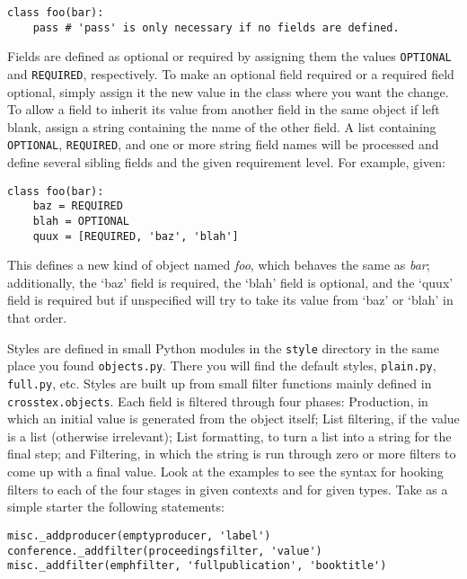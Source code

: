 \documentclass{article}
\begin{document}
\begin{small}\begin{verbatim}
class foo(bar):
    pass # 'pass' is only necessary if no fields are defined.
\end{verbatim}\end{small}

Fields are defined as optional or required by assigning them the values
\texttt{OPTIONAL} and \texttt{REQUIRED}, respectively.  To make an
optional field required or a required field optional, simply assign
it the new value in the class where you want the change.  To allow a
field to inherit its value from another field in the same object if
left blank, assign a string containing the name of the other field.
A list containing \texttt{OPTIONAL}, \texttt{REQUIRED}, and one or more
string field names will be processed and define several sibling fields
and the given requirement level.  For example, given:

\begin{small}\begin{verbatim}
class foo(bar):
    baz = REQUIRED
    blah = OPTIONAL
    quux = [REQUIRED, 'baz', 'blah']
\end{verbatim}\end{small}

This defines a new kind of object named \textit{foo}, which behaves
the same as \textit{bar}; additionally, the `baz' field is required,
the `blah' field is optional, and the `quux' field is required but if
unspecified will try to take its value from `baz' or `blah' in that order.

Styles are defined in small Python modules in the \texttt{style}
directory in the same place you found \texttt{objects.py}.  There you
will find the default styles, \texttt{plain.py}, \texttt{full.py}, etc.
Styles are built up from small filter functions mainly defined in
\texttt{crosstex.objects}.  Each field is filtered through four phases:
Production, in which an initial value is generated from the object
itself; List filtering, if the value is a list (otherwise irrelevant);
List formatting, to turn a list into a string for the final step; and
Filtering, in which the string is run through zero or more filters to
come up with a final value.  Look at the examples to see the syntax
for hooking filters to each of the four stages in given contexts and
for given types.  Take as a simple starter the following statements:

\begin{small}\begin{verbatim}
misc._addproducer(emptyproducer, 'label')
conference._addfilter(proceedingsfilter, 'value')
misc._addfilter(emphfilter, 'fullpublication', 'booktitle')
\end{verbatim}\end{small}
\end{document}
